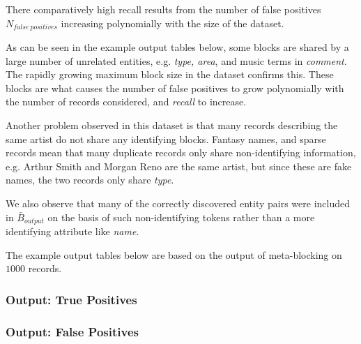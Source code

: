 \documentclass[a4paper,12pt]{article}
\begin{document}
There comparatively high recall results from the number of false positives $N_{false\ positives}$ increasing polynomially with the size of the dataset.

\begin{center}
\end{center}

As can be seen in the example output tables below, some blocks are shared by a large number of unrelated entities, e.g. \emph{type, area}, and music terms in \emph{comment}. The rapidly growing maximum block size in the dataset confirms this. These blocks are what causes the number of false positives to grow polynomially with the number of records considered, and \emph{recall} to increase.

Another problem observed in this dataset is that many records describing the same artist do not share any identifying blocks. Fantasy names, and sparse records mean that many duplicate records only share non-identifying information, e.g. Arthur Smith and Morgan Reno are the same artist, but since these are fake names, the two records only share \emph{type}.

We also observe that many of the correctly discovered entity pairs were included in $\bar B_{output}$ on the basis of such non-identifying tokens rather than a more identifying attribute like \emph{name}.

The example output tables below are based on the output of meta-blocking on $1000$ records.

\subsubsection{Output: True Positives}


\subsubsection{Output: False Positives}
\end{document}
